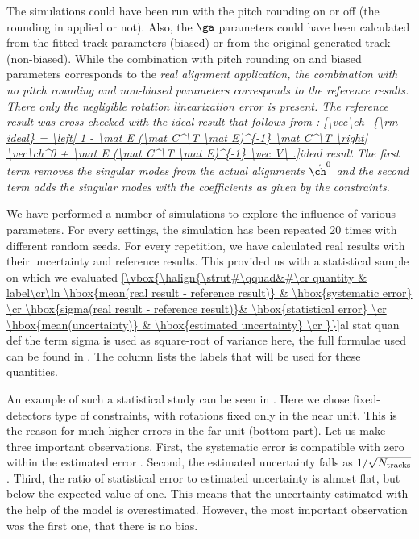 
The simulations could have been run with the pitch rounding on or off (the rounding in  applied or not). Also, the $\ga$ parameters could have been calculated from the fitted track parameters (biased) or from the original generated track (non-biased). While the combination with pitch rounding on and biased parameters corresponds to the \em{real} alignment application, the combination with no pitch rounding and non-biased parameters corresponds to the \em{reference} results. There only the negligible rotation linearization error is present. The reference result was cross-checked with the \em{ideal} result that follows from :
\eqref{\vec\ch_{\rm ideal} = \left[ 1 - \mat E (\mat C^\T \mat E)^{-1} \mat C^\T \right] \vec\ch^0 + \mat E (\mat C^\T \mat E)^{-1} \vec V\ .}{ideal result}
The first term removes the singular modes from the actual alignments $\vec\ch^0$ and the second term adds the singular modes with the coefficients as given by the constraints. 


We have performed a number of simulations to explore the influence of various parameters. For every settings, the simulation has been repeated 20 times with different random seeds. For every repetition, we have calculated real results with their uncertainty and reference results. This provided us with a statistical sample on which we evaluated
\eqref{\vbox{\halign{\strut#\qquad&#\cr
quantity & label\cr\ln
\hbox{mean(real result - reference result)}	& \hbox{systematic error} \cr
\hbox{sigma(real result - reference result)}& \hbox{statistical error} \cr
\hbox{mean(uncertainty)} 					& \hbox{estimated uncertainty} \cr
}}}{al stat quan def}
the term sigma is used as square-root of variance here, the full formulae used can be found in . The \rhs{} column lists the labels that will be used for these quantities.

An example of such a statistical study can be seen in . Here we chose fixed-detectors type of constraints, with rotations fixed only in the near unit. This is the reason for much higher errors in the far unit (bottom part). Let us make three important observations. First, the systematic error is compatible with zero within the estimated error . Second, the estimated uncertainty falls as $1/\sqrt{N_{\rm tracks}}$. Third, the ratio of statistical error to estimated uncertainty is almost flat, but below the expected value of one. This means that the uncertainty estimated with the help of the model  is overestimated. However, the most important observation was the first one, that there is no bias.

